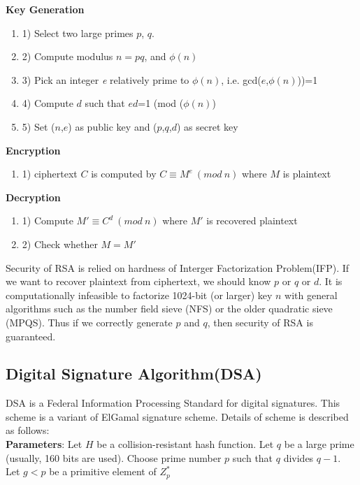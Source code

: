 \documentclass[a4paper]{article}
\begin{document}
\textbf{Key Generation}
\begin{enumerate}[label=]
      \item 1) Select two large primes $p$, $q$.
      
      \item 2) Compute modulus $n=pq$, and $\phi(n)$ 
      
      \item 3) Pick an integer \textit{e} relatively prime to $\phi(n)$, i.e. gcd($e$,$\phi(n)$))=1
      
      \item 4) Compute $d$ such that $ed$=1 (mod ($\phi(n)$)
      
      \item 5) Set ($n$,$e$) as public key  and ($p$,$q$,$d$) as secret key  
\end{enumerate}

\textbf{Encryption}
\begin{enumerate}[label=]
      \item 1) ciphertext $C$ is computed by  $C \equiv M^e \ (mod \ n)$ where $M$ is plaintext
\end{enumerate} 

\textbf{Decryption}
\begin{enumerate}[label=]
      \item 1) Compute $M' \equiv C^d \ (mod \ n)$ where $M'$ is recovered plaintext
      \item 2) Check whether $M=M'$
\end{enumerate} 

Security of RSA is relied on hardness of Interger Factorization Problem(IFP). If we want to recover plaintext from ciphertext, we should know $p$ or $q$ or $d$. It is computationally infeasible to factorize 1024-bit (or larger) key $n$ with general algorithms such as the number field sieve (NFS) or the older quadratic sieve (MPQS). Thus if we correctly generate $p$ and $q$, then security of RSA is guaranteed.

\subsection{Digital Signature Algorithm(DSA)}
DSA is a Federal Information Processing Standard for digital signatures. This scheme is a variant of ElGamal signature scheme. Details of scheme is described as follows:
\\

\textbf{Parameters}: Let $H$ be a collision-resistant hash function. Let $q$ be a large prime (usually, 160 bits are used). Choose prime number $p$ such that $q$ divides $q-1$. Let $g<p$ be a primitive element of $Z_p^*$
\\
\end{document}
